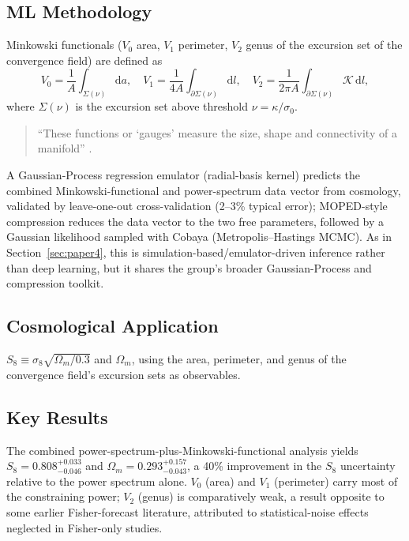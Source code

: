 \documentclass[11pt]{article}
\begin{document}
\subsection{ML Methodology}
Minkowski functionals ($V_0$ area, $V_1$ perimeter, $V_2$ genus of the excursion set of the convergence field) are defined as
\begin{equation}
V_0=\frac{1}{A}\int_{\Sigma(\nu)}\!\mathrm{d}a,\quad
V_1=\frac{1}{4A}\int_{\partial\Sigma(\nu)}\!\mathrm{d}l,\quad
V_2=\frac{1}{2\pi A}\int_{\partial\Sigma(\nu)}\!\mathcal{K}\,\mathrm{d}l,
\end{equation}
where $\Sigma(\nu)$ is the excursion set above threshold $\nu=\kappa/\sigma_0$.

\begin{quote}
\enquote{These functions or `gauges' measure the size, shape and connectivity of a manifold} \citep[p.~2]{armijo2025minkowski}.
\end{quote}

\noindent A Gaussian-Process regression emulator (radial-basis kernel) predicts the combined Minkowski-functional and power-spectrum data vector from cosmology, validated by leave-one-out cross-validation (2--3\% typical error); MOPED-style compression reduces the data vector to the two free parameters, followed by a Gaussian likelihood sampled with Cobaya (Metropolis--Hastings MCMC). As in Section~\ref{sec:paper4}, this is simulation-based/emulator-driven inference rather than deep learning, but it shares the group's broader Gaussian-Process and compression toolkit.

\subsection{Cosmological Application}
$S_8\equiv\sigma_8\sqrt{\Omega_m/0.3}$ and $\Omega_m$, using the area, perimeter, and genus of the convergence field's excursion sets as observables.

\subsection{Key Results}
The combined power-spectrum-plus-Minkowski-functional analysis yields $S_8=0.808^{+0.033}_{-0.046}$ and $\Omega_m=0.293^{+0.157}_{-0.043}$, a 40\% improvement in the $S_8$ uncertainty relative to the power spectrum alone. $V_0$ (area) and $V_1$ (perimeter) carry most of the constraining power; $V_2$ (genus) is comparatively weak, a result opposite to some earlier Fisher-forecast literature, attributed to statistical-noise effects neglected in Fisher-only studies.
\end{document}

